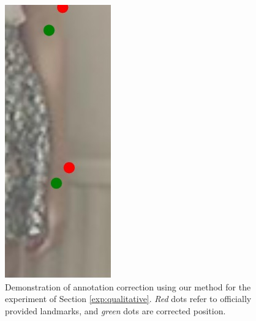 \begin{figure}[!t]
    \hfill
    \includegraphics[height=\fh]{resources/Annotation_Correction/Fixing/fix_18}
    \caption{Demonstration of annotation correction using our method for the experiment of Section \ref{exp:qualitative}. \emph{Red} dots refer to officially provided landmarks, and \emph{green} dots are corrected position.}
    \label{fig:qualitative_anno}
\end{figure}

